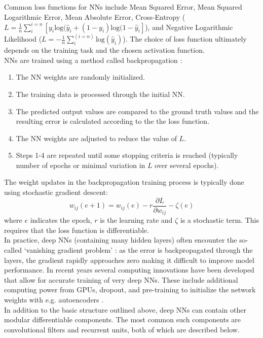 Common loss functions for NNs include Mean Squared Error, Mean Squared Logarithmic Error, Mean Absolute Error, Cross-Entropy 
($L=\frac{1}{n}\sum_i^{i=n}[y_{i}\text{log}(\hat{y}_i+(1-y_i)\text{log}(1-\hat{y}_i]$), and Negative Logarithmic Likelihood ($L=-\frac{1}{n}\sum_i^(i=n)\text{log}(\hat{y}_i)$). The choice of loss function ultimately depends on the training task and the chosen activation function.\\

NNs are trained using a method called backpropagation \cite{backprop}:
\begin{enumerate}
    \item The NN weights are randomly initialized.
    \item The training data is processed through the initial NN.
    \item The predicted output values are compared to the ground truth values and the resulting error is calculated according to the the loss function.
    \item The NN weights are adjusted to reduce the value of $L$.
    \item Steps 1-4 are repeated until some stopping criteria is reached (typically number of epochs or minimal variation in $L$ over several epochs).
\end{enumerate}
\noindent The weight updates in the backpropagation training process is typically done using stochastic gradient descent:
$$
w_{ij}(e+1)=w_{ij}(e)-r\frac{\partial L}{\partial w_{ij}}-\zeta(e)
$$
\noindent where $e$ indicates the epoch, $r$ is the learning rate and $\zeta$ is a stochastic term. This requires that the loss function is differentiable.\\

In practice, deep NNs (containing many hidden layers) often encounter the so-called `vanishing gradient problem' \cite{vanishing_gradient}: as the error is backpropagated through the layers, the gradient rapidly approaches zero making it difficult to improve model performance. In recent years several computing innovations have been developed that allow for accurate training of very deep NNs. These include additional computing power from GPUs, dropout, and pre-training to initialize the network weights with e.g. autoencoders \cite{autoencoders}.\\

In addition to the basic structure outlined above, deep NNs can contain other modular differentiable components. The most common such components are convolutional filters and recurrent units, both of which are described below.

